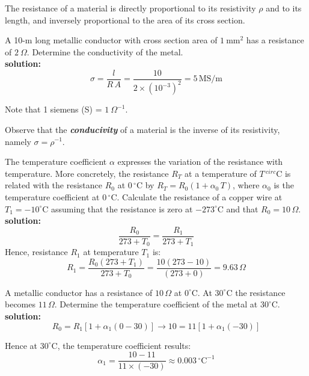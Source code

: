 \begin{remark}
The resistance of a material is directly proportional to its resistivity $\rho$ and to its length, and inversely proportional to the area of its cross section.
\end{remark}

\begin{exercise}
A 10-m long metallic conductor with cross section area of $1~\textrm{mm}^2$ has a resistance of $2~\Omega$. Determine the conductivity of the metal. \\

\textbf{solution:}\\
\[\sigma = \frac{l}{R\,A}=\frac{10}{2 \times (10^{-3})^2} = 5\,\textrm{MS/m}\]

Note that 1 siemens (S) = $1~\Omega^{-1}$.
\end{exercise}

\begin{remark}
Observe that the \textbf{\emph{conducivity}} of a material is the inverse of its resistivity, namely $\sigma=\rho^{-1}$.
\end{remark}

\begin{exercise}
The temperature coefficient $\alpha$ expresses the variation of the resistance with temperature. More concretely, the resistance $R_T$ at a temperature of $T\, ^{circ}\textrm{C}$ is related with the resistance $R_0$ at $0\,^{\circ}\textrm{C}$ by $R_T=R_0(1+\alpha_0\,T)$, where $\alpha_0$ is the temperature coefficient at $0\,^{\circ}\textrm{C}$. Calculate the resistance of a copper wire at $T_1=-10^{\circ}\textrm{C}$ assuming that the resistance is zero at $-273^{\circ}\textrm{C}$ and that $R_0=10\,\Omega$.\\

\textbf{solution:}\\
\[\frac{R_0}{273+T_0} = \frac{R_1}{273+T_1}\]
Hence, resistance $R_1$ at temperature $T_1$ is:
\[R_1 = \frac{R_0(273+T_1)}{273+T_0}=\frac{10(273 - 10)}{(273 + 0)} = 9.63\,\Omega\]
\end{exercise}


\begin{exercise}\label{ex:2.4}
A metallic conductor has a resistance of $10\,\Omega$ at $0^{\circ}\textrm{C}$. At $30^{\circ}\textrm{C}$ the resistance becomes $11\,\Omega$. Determine the temperature coefficient of the metal at $30^{\circ}\textrm{C}$.\\

\textbf{solution:}\\
\[R_0 = R_1[1 + \alpha_1(0 -30)]\longrightarrow 10 = 11[1 + \alpha_1(-30)]\]

Hence at $30^{\circ}\textrm{C}$, the temperature coefficient results:
\[\alpha_1 = \frac{10-11}{11 \times (-30)} \approx 0.003\,^{\circ}\textrm{C}^{-1}\]
\end{exercise}

